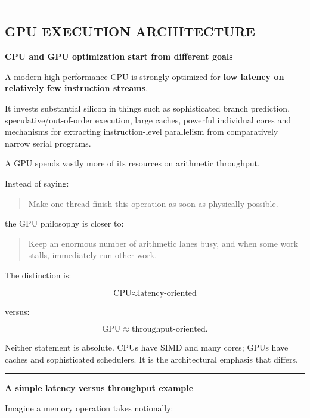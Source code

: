 \begin{center}\rule{0.5\linewidth}{0.5pt}\end{center}

\subsection{GPU EXECUTION ARCHITECTURE}\label{03-visual-computing-i-ch015-gpu-execution-architecture}

\textbf{CPU and GPU optimization start from different goals}

A modern high-performance CPU is strongly optimized for \textbf{low latency on relatively few instruction streams}.

It invests substantial silicon in things such as sophisticated branch prediction, speculative/out-of-order execution, large caches, powerful individual cores and mechanisms for extracting instruction-level parallelism from comparatively narrow serial programs.

A GPU spends vastly more of its resources on arithmetic throughput.

Instead of saying:

\begin{quote}
Make one thread finish this operation as soon as physically possible.
\end{quote}

the GPU philosophy is closer to:

\begin{quote}
Keep an enormous number of arithmetic lanes busy, and when some work stalls, immediately run other work.
\end{quote}

The distinction is:

\[
\boxed{
\text{CPU}\approx\text{latency-oriented}
}
\]

versus:

\[
\boxed{
\text{GPU}\approx\text{throughput-oriented}.
}
\]

Neither statement is absolute. CPUs have SIMD and many cores; GPUs have caches and sophisticated schedulers. It is the architectural emphasis that differs.

\begin{center}\rule{0.5\linewidth}{0.5pt}\end{center}

\textbf{A simple latency versus throughput example}

Imagine a memory operation takes notionally:

